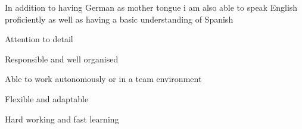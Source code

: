
\begin{cvparagraph}
In addition to having German as mother tongue i am also able to speak English proficiently as well as having a basic understanding of Spanish
\end{cvparagraph}

\newline

\begin{cvparagraph}

\begin{cvitems}
  \item Attention to detail
  \item Responsible and well organised
  \item Able to work autonomously or in a team environment
  \item Flexible and adaptable
  \item Hard working and fast learning
\end{cvitems}
\end{cvparagraph}



